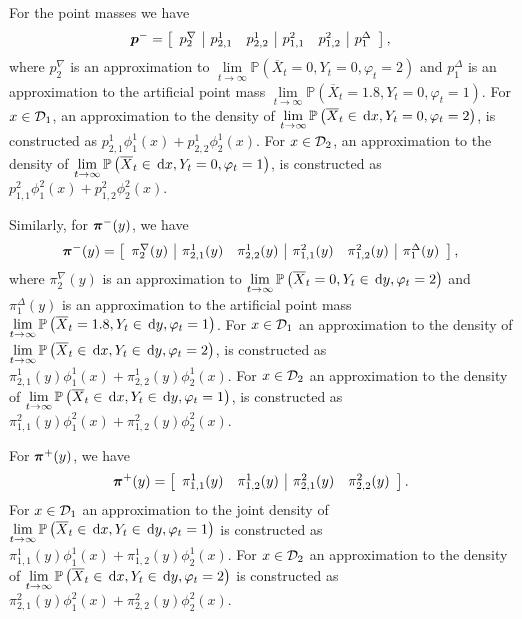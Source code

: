 For the point masses we have 
\[ {\boldsymbol p}^- = \left[\begin{array}{c|cc|cc|c} {p}_{2}^\nabla &  {p}_{2,1}^1 &  {p}_{2,2}^1 &  {p}_{1,1}^2 &  {p}_{1,2}^2 &  {p}_{1}^\Delta \end{array}\right],\]
where \( {p}_{2}^\nabla\) is an approximation to \( \lim\limits_{t\to\infty}\mathbb{P}\left(\overline X_{t} =0, Y_t=0, \varphi_{t} = 2\right)\) and \( {p}_{1}^\Delta\) is an approximation to the artificial point mass \( \lim\limits_{t\to\infty}\mathbb{P}\left(\overline X_t =1.8, Y_t=0, \varphi_{t} = 1\right)\). For \(x\in\mathcal{D}_1\), an approximation to the density of \( \lim\limits_{t\to\infty}\mathbb{P}\left(\overline X_t \in \, \mathrm{d} x, Y_t = 0, \varphi_{t} = 2\right)\), is constructed as \( {p}_{2,1}^1\phi_1^1(x) +  {p}_{2,2}^1\phi_2^1(x)\). For \(x\in\mathcal{D}_2\), an approximation to the density of \( \lim\limits_{t\to\infty}\mathbb{P}\left(\overline X_t \in \, \mathrm{d} x, Y_t = 0, \varphi_{t} = 1\right)\), is constructed as \( {p}_{1,1}^2\phi_1^2(x) +  {p}_{1,2}^2\phi_2^2(x).\)

Similarly, for \( {\boldsymbol\pi}^-(y)\), we have 
\[ {\boldsymbol \pi}^-(y) = \left[\begin{array}{c|cc|cc|c} {\pi}_{2}^\nabla(y) &  {\pi}_{2,1}^1(y) &  {\pi}_{2,2}^1(y) &  {\pi}_{1,1}^2(y) &  {\pi}_{1,2}^2(y) &  {\pi}_{1}^\Delta(y) \end{array}\right],\]
where \( {\pi}_{2}^\nabla(y)\) is an approximation to \( \lim\limits_{t\to\infty}\mathbb{P}\left(\overline X_t =0, Y_t\in\, \mathrm{d} y, \varphi_{t} = 2\right)\) and \( {\pi}_{1}^\Delta(y)\) is an approximation to the artificial point mass \( \lim\limits_{t\to\infty}\mathbb{P}\left(\overline X_t =1.8, Y_t\in \, \mathrm{d} y, \varphi_{t} = 1\right)\). For \(x\in\mathcal{D}_1\) an approximation to the density of \( \lim\limits_{t\to\infty}\mathbb{P}\left(\overline X_t \in \, \mathrm{d} x, Y_t \in \, \mathrm{d} y, \varphi_{t} = 2\right)\), is constructed as \( {\pi}_{2,1}^1(y)\phi_1^1(x) +  {\pi}_{2,2}^1(y)\phi_2^1(x)\). For \(x\in\mathcal{D}_2\) an approximation to the density of \( \lim\limits_{t\to\infty}\mathbb{P}\left(\overline X_t \in \, \mathrm{d} x, Y_t \in \, \mathrm{d} y, \varphi_{t} = 1\right)\), is constructed as \( {\pi}_{1,1}^2(y)\phi_1^2(x) +  {\pi}_{1,2}^2(y)\phi_2^2(x).\)

For \( {\boldsymbol\pi}^+(y)\), we have 
\[ {\boldsymbol \pi}^+(y) = \left[\begin{array}{cc|cc}  {\pi}_{1,1}^1(y) &  {\pi}_{1,2}^1(y) &  {\pi}_{2,1}^2(y) &  {\pi}_{2,2}^2(y) \end{array}\right].\]
For \(x\in\mathcal{D}_1\) an approximation to the joint density of \( \lim\limits_{t\to\infty}\mathbb{P}\left(\overline X_t \in \, \mathrm{d} x, Y_t \in \, \mathrm{d} y, \varphi_{t} = 1\right)\) is constructed as \( {\pi}_{1,1}^1(y)\phi_1^1(x) +  {\pi}_{1,2}^1(y)\phi_2^1(x)\). For \(x\in\mathcal{D}_2\) an approximation to the density of \( \lim\limits_{t\to\infty}\mathbb{P}\left(\overline X_t \in \, \mathrm{d} x, Y_t \in \, \mathrm{d} y, \varphi_{t} = 2\right)\) is constructed as \( {\pi}_{2,1}^2(y)\phi_1^2(x) +  {\pi}_{2,2}^2(y)\phi_2^2(x).\)

